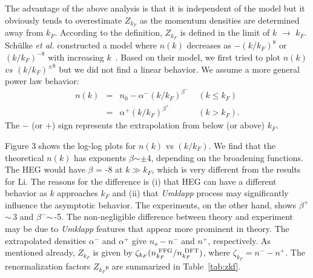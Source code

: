 \documentclass[twocolumn,showpacs,showkeys,fleqn,prl,superscriptaddress]{revtex4}%
\newcommand{\nn}[1]{\textnormal{ #1}}
\newcommand{\ii}[1]{\textit{#1}}
\begin{document}
The advantage of the above analysis is that it is independent of the model but it obviously tends to overestimate $Z_{k_F}$ as the momentum densities are determined away from $k_F$.
According to the definition, $Z_{k_F}$ is defined in the limit of $k$ $\to$ $k_F$.
Sch{\"u}lke \ii{et al.}\,\,constructed a model where $n(k)$ decreases as $-(k/k_F)^{8}$ or $(k/k_F)^{-8}$ with increasing $k$~\cite{schulke96}.
Based on their model, we first tried to plot $n(k)$ $vs$ $(k/k_F)^{\pm 8}$ but we did not find a linear behavior.
We assume a more general  power law behavior:
\begin{eqnarray}
n(k) &=& n_0 - \alpha^{-}  (k/k_F)^{\beta^-}  \;\;\;\; (k \leq k_F)  \nonumber \\
&=&  \alpha^{+}  (k/k_F)^{\beta^+}  \;\;\;\;\;\;\;\;\;\;\;\; (k>k_F).
\end{eqnarray}
The $-$ (or $+$) sign represents the extrapolation from  below (or above) $k_F$.

Figure 3 shows the log-log plots for $n(k)$ vs $(k/k_F)$. %
We find that the theoretical $n(k)$ has  exponents $\beta$$\sim\pm$4, depending on the broadening functions.
The HEG  would have $\beta$ = -8 at $k \gg k_F$, which is very different from the results for Li.
The reasons for the difference is (i) that HEG can have a different behavior as $k$ approaches $k_F$ and (ii) that {\it Umklapp} process may significantly influence the asymptotic behavior.
The experiments, on the other hand, shows $\beta^+$$\sim\,$3 and $\beta^-$$\sim\,$-5.
The non-negligible difference between theory and experiment may be due to {\it Umklapp} features that appear more prominent in theory.
The extrapolated densities $\alpha^-$ and $\alpha^+$ give $n_o - n^-$ and $n^+$, respectively.
As mentioned already,  $Z_{k_F}$ is given by $\zeta_{k_F} (n_{k_F}^{\nn{FFG}}/n_{k_F}^{\nn{DFT}})$, where $\zeta_{k_F}= n^- - n^+$.   
The renormalization factors $Z_{k_F}$s are summarized in %
Table~\ref{tab:zkf}.
\end{document}
